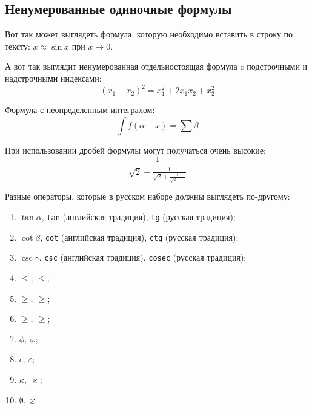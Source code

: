\documentclass[12pt]{extarticle}
\begin{document}
\subsection{Ненумерованные одиночные формулы}
\label{subsec:ch1/sec3/sub1}
Вот так может выглядеть формула, которую необходимо вставить в строку по тексту: \(x \approx \sin x\) при \(x \to 0\).

А вот так выглядит ненумерованная отдельностоящая формула c подстрочными и надстрочными индексами:
\[(x_1+x_2)^2 = x_1^2 + 2 x_1 x_2 + x_2^2\]

Формула с неопределенным интегралом:
\[\int f(\alpha+x)=\sum\beta\]

При использовании дробей формулы могут получаться очень высокие:
\[\frac{1}{\sqrt{2}+
        \displaystyle\frac{1}{\sqrt{2}+
            \displaystyle\frac{1}{\sqrt{2}+\cdots}}}\]

Разные операторы, которые в русском наборе должны выглядеть по-другому:
\begin{enumerate}
\item \(\tan\alpha\), \texttt{tan} (английская традиция), \texttt{tg} (русская традиция);
\item \(\cot\beta\), \texttt{cot} (английская традиция), \texttt{ctg} (русская традиция);
\item \(\csc\gamma\), \texttt{csc} (английская традиция), \texttt{cosec} (русская традиция);
\item \(\le\), \(\leqslant\);
\item \(\ge,\ \geqslant\);
\item \(\geq,\ \geqslant\);
\item \(\phi,\ \varphi\);
\item \(\epsilon,\ \varepsilon\);
\item \(\kappa,\ \varkappa\);
\item \(\emptyset,\ \varnothing\)
\end{enumerate}
\end{document}
